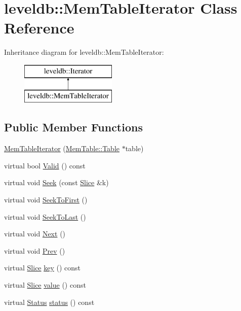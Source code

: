 \hypertarget{classleveldb_1_1_mem_table_iterator}{}\section{leveldb\+:\+:Mem\+Table\+Iterator Class Reference}
\label{classleveldb_1_1_mem_table_iterator}
Inheritance diagram for leveldb\+:\+:Mem\+Table\+Iterator\+:\begin{figure}[H]
\begin{center}
\leavevmode
\includegraphics[height=2.000000cm]{classleveldb_1_1_mem_table_iterator}
\end{center}
\end{figure}
\subsection*{Public Member Functions}
\begin{DoxyCompactItemize}
\item 
\hyperlink{classleveldb_1_1_mem_table_iterator_a3cf243a6e8166d55ce87081f69a5ecd7}{Mem\+Table\+Iterator} (\hyperlink{classleveldb_1_1_skip_list}{Mem\+Table\+::\+Table} $\ast$table)
\item 
virtual bool \hyperlink{classleveldb_1_1_mem_table_iterator_a95a8909aa37acb52f85a88c97329fa11}{Valid} () const 
\item 
virtual void \hyperlink{classleveldb_1_1_mem_table_iterator_a140f9575286994337de9b49ea7fe62cb}{Seek} (const \hyperlink{classleveldb_1_1_slice}{Slice} \&k)
\item 
virtual void \hyperlink{classleveldb_1_1_mem_table_iterator_a72eaf5c1bcb6d513f71d4edcb8db3f98}{Seek\+To\+First} ()
\item 
virtual void \hyperlink{classleveldb_1_1_mem_table_iterator_aaed044dc887a51c924086f2a2844a5f0}{Seek\+To\+Last} ()
\item 
virtual void \hyperlink{classleveldb_1_1_mem_table_iterator_a8ce5457cf61b989ce1ceec80084f891c}{Next} ()
\item 
virtual void \hyperlink{classleveldb_1_1_mem_table_iterator_a61f8a385b268158a1e7bd0cba29a83c1}{Prev} ()
\item 
virtual \hyperlink{classleveldb_1_1_slice}{Slice} \hyperlink{classleveldb_1_1_mem_table_iterator_a3e9b1c478d4ba8747dae4c8acb77a289}{key} () const 
\item 
virtual \hyperlink{classleveldb_1_1_slice}{Slice} \hyperlink{classleveldb_1_1_mem_table_iterator_a5910c8d44980cdec2d8ba603aabb98b8}{value} () const 
\item 
virtual \hyperlink{classleveldb_1_1_status}{Status} \hyperlink{classleveldb_1_1_mem_table_iterator_a1669aab641ff394968c30581a6b63f2a}{status} () const 
\end{DoxyCompactItemize}

